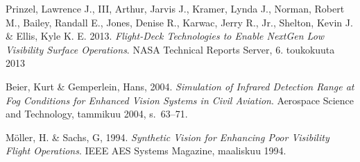\documentclass[utf8,bachelor,manualbib]{gradu3}
\begin{document}

\begin{thebibliography}{}



Prinzel, Lawrence J., III, Arthur, Jarvis J., Kramer, Lynda J.,  Norman, Robert M., Bailey, Randall E., Jones, Denise R.,  Karwac, Jerry R., Jr., Shelton, Kevin J. \& Ellis, Kyle K. E. 2013.
\textit{Flight-Deck Technologies to Enable NextGen Low Visibility Surface Operations}. NASA Technical Reports Server, 6. toukokuuta 2013

Beier, Kurt \& Gemperlein, Hans, 2004.
\textit{Simulation of Infrared Detection Range at Fog Conditions for Enhanced Vision Systems in Civil Aviation}. Aerospace Science and Technology, tammikuu 2004, s.~63--71.

Möller, H. \& Sachs, G, 1994.
\textit{Synthetic Vision for Enhancing Poor Visibility Flight Operations}. IEEE AES Systems Magazine, maaliskuu 1994.

\end{thebibliography}
\end{document}
